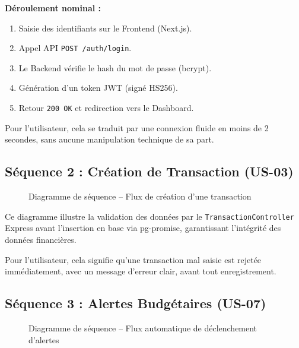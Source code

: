 \textbf{Déroulement nominal :}
\begin{enumerate}
    \item Saisie des identifiants sur le Frontend (Next.js).
    \item Appel API \texttt{POST /auth/login}.
    \item Le Backend vérifie le hash du mot de passe (bcrypt).
    \item Génération d'un token JWT (signé HS256).
    \item Retour \texttt{200 OK} et redirection vers le Dashboard.
\end{enumerate}

Pour l'utilisateur, cela se traduit par une connexion fluide en moins de 2 secondes, sans aucune manipulation technique de sa part.

\subsection{Séquence 2 : Création de Transaction (US-03)}

\begin{figure}[H]
    \centering
    \caption{Diagramme de séquence -- Flux de création d'une transaction}
    \label{fig:seq-transaction}
\end{figure}

Ce diagramme illustre la validation des données par le \texttt{TransactionController} Express avant l'insertion en base via pg-promise, garantissant l'intégrité des données financières.

Pour l'utilisateur, cela signifie qu'une transaction mal saisie est rejetée immédiatement, avec un message d'erreur clair, avant tout enregistrement.

\subsection{Séquence 3 : Alertes Budgétaires (US-07)}

\begin{figure}[H]
    \centering
    \caption{Diagramme de séquence -- Flux automatique de déclenchement d'alertes}
    \label{fig:seq-alert}
\end{figure}


